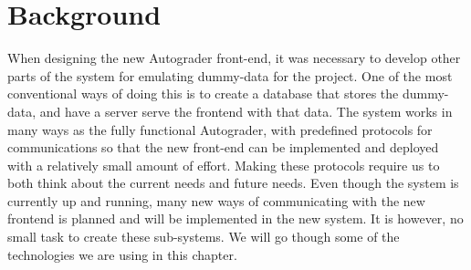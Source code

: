 \chapter{Background}
When designing the new Autograder front-end, it was necessary to develop other parts of the system for emulating dummy-data for the project. One of the most conventional ways of doing this is to create a database that stores the dummy-data, and have a server serve the frontend with that data. The system works in many ways as the fully functional Autograder, with predefined protocols for communications so that the new front-end can be implemented and deployed with a relatively small amount of effort. Making these protocols require us to both think about the current needs and future needs. Even though the system is currently up and running, many new ways of communicating with the new frontend is planned and will be implemented in the new system. It is however, no small task to create these sub-systems. We will go though some of the technologies we are using in this chapter.


